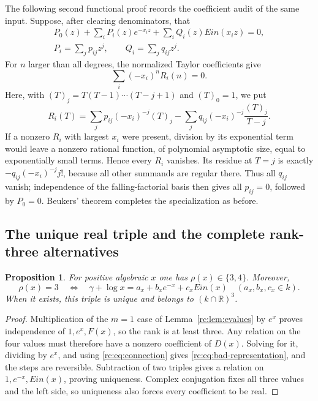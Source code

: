 \documentclass[11pt,a4paper]{article}
\newtheorem{proposition}[theorem]{Proposition}
\theoremstyle{definition}
\theoremstyle{remark}
\theoremstyle{plain}
\numberwithin{equation}{section}
\def\operatorname#1{#1}\def\mathrm#1{#1}}
\providecommand{\rcEin}{\operatorname{Ein}}
\providecommand{\rcR}{\mathbb R}
\begin{document}
The following second functional proof records the coefficient audit of
the same input.  Suppose, after clearing denominators, that
\begin{gather*}
 P_0(z)+\sum_iP_i(z)e^{-x_i z}+\sum_iQ_i(z)\rcEin(x_i z)=0,\\
 P_i=\sum_jp_{ij}z^j,\qquad Q_i=\sum_jq_{ij}z^j.
\end{gather*}
For $n$ larger than all degrees, the normalized Taylor coefficients give
\[
 \sum_i(-x_i)^nR_i(n)=0.
\]
Here, with $(T)_j=T(T-1)\cdots(T-j+1)$ and $(T)_0=1$, we put
\begin{equation}\label{rc:eq:coefficient-audit}
 R_i(T)=\sum_jp_{ij}(-x_i)^{-j}(T)_j
       -\sum_jq_{ij}(-x_i)^{-j}\frac{(T)_j}{T-j}.
\end{equation}
If a nonzero $R_i$ with largest $x_i$ were present, division by its
exponential term would leave a nonzero rational function, of polynomial
asymptotic size, equal to exponentially small terms.  Hence every $R_i$
vanishes.  Its residue at $T=j$ is exactly
$-q_{ij}(-x_i)^{-j}j!$, because all other summands are regular there.
Thus all $q_{ij}$ vanish; independence of the falling-factorial basis
then gives all $p_{ij}=0$, followed by $P_0=0$.  Beukers' theorem completes
the specialization as before.

\subsection{The unique real triple and the complete rank-three alternatives}

\begin{proposition}\label{rc:prop:bad-representation}
For positive algebraic $x$ one has $\rho(x)\in\{3,4\}$.  Moreover,
\begin{equation}\label{rc:eq:bad-representation}
 \rho(x)=3\quad\Longleftrightarrow\quad
 \gamma+\log x=a_x+b_xe^{-x}+c_x\rcEin(x)
 \quad(a_x,b_x,c_x\in k).
\end{equation}
When it exists, this triple is unique and belongs to $(k\cap\rcR)^3$.
\end{proposition}

\begin{proof}
Multiplication of the $m=1$ case of Lemma~\ref{rc:lem:evalues} by
$e^x$ proves independence of $1,e^x,F(x)$, so the rank is at least three.
Any relation on the four values must therefore have a nonzero coefficient
of $D(x)$.  Solving for it, dividing by $e^x$, and using
\eqref{rc:eq:connection} gives \eqref{rc:eq:bad-representation}, and the
steps are reversible.  Subtraction of two triples gives a relation on
$1,e^{-x},\rcEin(x)$, proving uniqueness.  Complex conjugation fixes
all three values and the left side, so uniqueness also forces every
coefficient to be real.
\end{proof}
\end{document}
